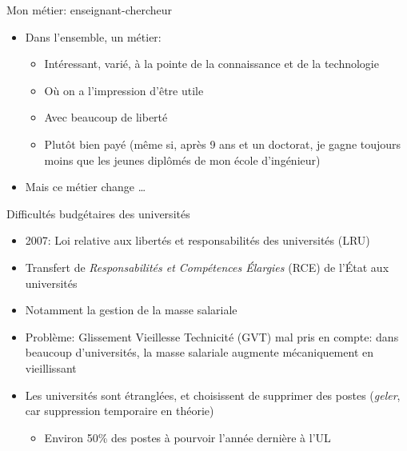 \documentclass[10pt,final,usepdftitle=false]{beamer}
\begin{document}
\begin{frame}{Mon métier: enseignant-chercheur}
\begin{itemize}
\item Dans l'ensemble, un métier:
\begin{itemize}
\item Intéressant, varié, à la pointe de la connaissance et de la technologie
\item Où on a l'impression d'être utile
\item Avec beaucoup de liberté
\item Plutôt bien payé (même si, après 9 ans et un doctorat, je gagne toujours moins que les jeunes diplômés de mon école d'ingénieur)
\end{itemize}
\pause
\item Mais ce métier change \ldots
\end{itemize}
\end{frame}

\begin{frame}{Difficultés budgétaires des universités}
\begin{itemize}
\item 2007: Loi relative aux libertés et responsabilités des universités (LRU)
\item Transfert de \textsl{Responsabilités et Compétences Élargies} (RCE) de l'État aux universités
\item Notamment la gestion de la masse salariale
\item Problème: Glissement Vieillesse Technicité (GVT) mal pris en compte:
	dans beaucoup d'universités, la masse salariale augmente mécaniquement en vieillissant
\item Les universités sont étranglées, et choisissent de supprimer des postes (\textsl{geler}, car 
    suppression temporaire en théorie)
    \begin{itemize}
	\item Environ 50\% des postes à pourvoir l'année dernière à l'UL
	\end{itemize}
\end{itemize}
\end{frame}
\end{document}
